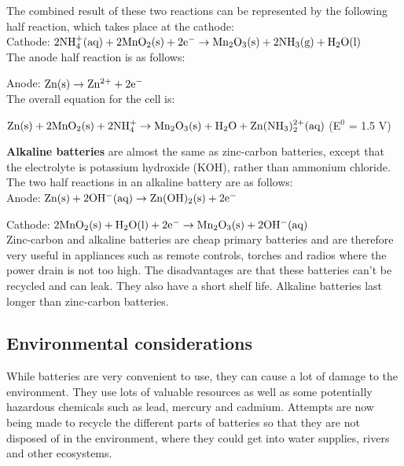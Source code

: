 The combined result of these two reactions can be represented by the following half reaction, which takes place at the cathode:\\

Cathode: $\rm{2NH_{4}^{+}(aq) + 2MnO_{2}(s) + 2e^{-} \rightarrow Mn_{2}O_{3}(s) + 2NH_{3}(g) + H_{2}O(l)}$\\

The anode half reaction is as follows:

Anode: $\rm{Zn(s) \rightarrow Zn^{2+} + 2e^{-}}$\\

The overall equation for the cell is:

\begin{center}
$\rm{Zn(s) + 2MnO_{2}(s) + 2NH_{4}^{+} \rightarrow Mn_{2}O_{3}(s) + H_{2}O + Zn(NH_{3})_{2}^{2+}(aq)}$ (E$^{0}$ = 1.5 V)
\end{center}

\textbf{Alkaline batteries} are almost the same as zinc-carbon batteries, except that the electrolyte is potassium hydroxide (KOH), rather than ammonium chloride. The two half reactions in an alkaline battery are as follows:\\

Anode: $\rm{Zn(s) + 2OH^{-}(aq) \rightarrow Zn(OH)_{2}(s) + 2e^{-}}$

Cathode: $\rm{2MnO_{2}(s) + H_{2}O(l) + 2e^{-} \rightarrow Mn_{2}O_{3}(s) + 2OH^{-}(aq)}$\\


Zinc-carbon and alkaline batteries are cheap primary batteries and are therefore very useful in appliances such as remote controls, torches and radios where the power drain is not too high. The disadvantages are that these batteries can't be recycled and can leak. They also have a short shelf life. Alkaline batteries last longer than zinc-carbon batteries.


\subsection{Environmental considerations}

While batteries are very convenient to use, they can cause a lot of damage to the environment. They use lots of valuable resources as well as some potentially hazardous chemicals such as lead, mercury and cadmium. Attempts are now being made to recycle the different parts of batteries so that they are not disposed of in the environment, where they could get into water supplies, rivers and other ecosystems.

